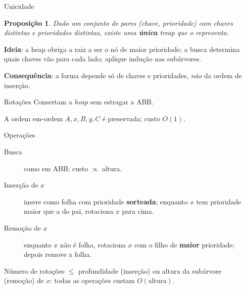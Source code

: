 \documentclass[aspectratio=169,11pt]{beamer}
\newcommand{\tri}[3]{%
  \draw (#1,#2) -- ++(-.45,-.9) -- ++(.9,0) -- cycle;
  \node at (#1,#2-.65) {#3};}
\newtheorem{proposicao}[theorem]{Proposição}
\theoremstyle{definition}
\begin{document}
\begin{frame}{Unicidade}
  \begin{proposicao}
    Dado um conjunto de pares (chave, prioridade) com chaves distintas
    e prioridades distintas, existe uma \textbf{única} treap que o
    representa.
  \end{proposicao}
  \pause
  \textbf{Ideia}: a heap obriga a raiz a ser o nó de maior prioridade;
  a busca determina quais chaves vão para cada lado; aplique indução
  nas subárvores.
  \pause
  \medskip
 
  \textbf{Consequência}: a forma depende só de chaves e prioridades,
  \emph{não} da ordem de inserção.
\end{frame}
 
\begin{frame}{Rotações}
  Consertam a \textit{heap} sem estragar a ABB.
 
  \vfill
 
  \centering
 
  \medskip
  A ordem em-ordem $A,x,B,y,C$ é preservada; custo $O(1)$.
\end{frame}
 
\begin{frame}{Operações}
  \begin{description}
  \item[Busca] como em ABB; custo $\propto$ altura.
  \pause
  \item[Inserção de $x$] insere como folha com prioridade
    \textbf{sorteada}; enquanto $x$ tem prioridade maior que a do pai,
    rotaciona $x$ para cima.
  \pause
  \item[Remoção de $x$] enquanto $x$ não é folha, rotaciona $x$ com o
    filho de \textbf{maior} prioridade; depois remove a folha.
  \end{description}
  \pause
  \medskip
  Número de rotações $\le$ profundidade (inserção) ou altura da
  subárvore (remoção) de $x$: todas as operações custam $O(\text{altura})$.
\end{frame}
 
\end{document}
